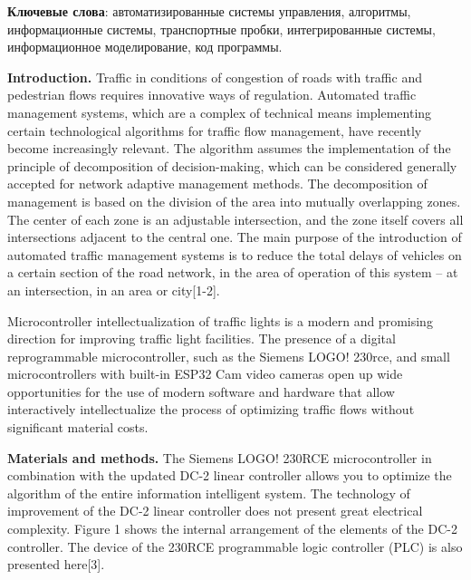 {\bfseries Ключевые слова}: автоматизированные системы управления, алгоритмы,
информационные системы, транспортные пробки, интегрированные системы,
информационное моделирование, код программы.

\begin{multicols}{2}
{\bfseries Introduction.} Traffic in conditions of congestion of roads with
traffic and pedestrian flows requires innovative ways of regulation.
Automated traffic management systems, which are a complex of technical
means implementing certain technological algorithms for traffic flow
management, have recently become increasingly relevant. The algorithm
assumes the implementation of the principle of decomposition of
decision-making, which can be considered generally accepted for network
adaptive management methods. The decomposition of management is based on
the division of the area into mutually overlapping zones. The center of
each zone is an adjustable intersection, and the zone itself covers all
intersections adjacent to the central one. The main purpose of the
introduction of automated traffic management systems is to reduce the
total delays of vehicles on a certain section of the road network, in
the area of operation of this system -- at an intersection, in an area
or city{[}1-2{]}.

Microcontroller intellectualization of traffic lights is a modern and
promising direction for improving traffic light facilities. The presence
of a digital reprogrammable microcontroller, such as the Siemens LOGO!
230rce, and small microcontrollers with built-in ESP32 Cam video cameras
open up wide opportunities for the use of modern software and hardware
that allow interactively intellectualize the process of optimizing
traffic flows without significant material costs.

{\bfseries Materials and methods.} The Siemens LOGO! 230RCE microcontroller
in combination with the updated DC-2 linear controller allows you to
optimize the algorithm of the entire information intelligent system. The
technology of improvement of the DC-2 linear controller does not present
great electrical complexity. Figure 1 shows the internal arrangement of
the elements of the DC-2 controller. The device of the 230RCE
programmable logic controller (PLC) is also presented here{[}3{]}.
\end{multicols}

